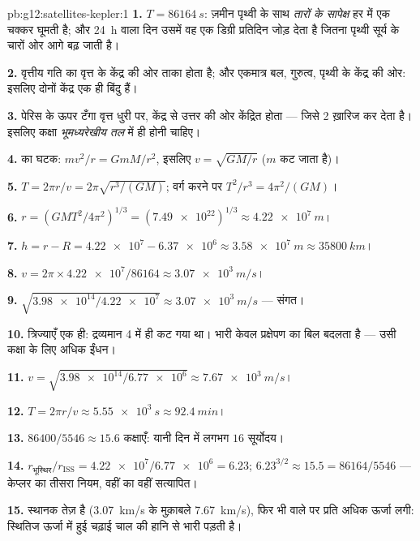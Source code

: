 \begin{solution}{pb:g12:satellites-kepler:1}
\textbf{1.} $T = \qty{86164}{s}$: ज़मीन पृथ्वी के साथ \emph{तारों के सापेक्ष} हर
 में एक चक्कर घूमती है; और \qty{24}{h} वाला दिन उसमें वह एक
डिग्री प्रतिदिन जोड़ देता है जितना पृथ्वी सूर्य के चारों ओर आगे बढ़ जाती है।

\textbf{2.} वृत्तीय गति का  वृत्त के केंद्र की ओर ताका होता
है; और एकमात्र बल, गुरुत्व, पृथ्वी के केंद्र की ओर: इसलिए दोनों केंद्र
एक ही बिंदु हैं।

\textbf{3.} पेरिस के ऊपर टँगा वृत्त धुरी पर, केंद्र से उत्तर की ओर केंद्रित
होता --- जिसे 2 ख़ारिज कर देता है। इसलिए कक्षा \emph{भूमध्यरेखीय तल}
में ही होनी चाहिए।

\textbf{4.}  का  घटक: $m v^2/r = GmM/r^2$, इसलिए $v = \sqrt{GM/r}$
($m$ कट जाता है)।

\textbf{5.} $T = 2\pi r/v = 2\pi\sqrt{r^3/(GM)}$; वर्ग करने पर $T^2/r^3 = 4\pi^2/(GM)$।

\textbf{6.} $r = \left(GMT^2/4\pi^2\right)^{1/3} =
(\num{7.49e22})^{1/3} \approx \qty{4.22e7}{m}$।

\textbf{7.} $h = r - R = \num{4.22e7} - \num{6.37e6} \approx
\qty{3.58e7}{m} \approx \qty{35800}{km}$।

\textbf{8.} $v = 2\pi \times \num{4.22e7}/\num{86164} \approx
\qty{3.07e3}{m/s}$।

\textbf{9.} $\sqrt{\num{3.98e14}/\num{4.22e7}} \approx
\qty{3.07e3}{m/s}$ --- संगत।

\textbf{10.} त्रिज्याएँ एक ही: द्रव्यमान 4 में ही कट गया था। भारी
 केवल प्रक्षेपण का बिल बदलता है --- उसी कक्षा के लिए
अधिक ईंधन।

\textbf{11.} $v = \sqrt{\num{3.98e14}/\num{6.77e6}} \approx
\qty{7.67e3}{m/s}$।

\textbf{12.} $T = 2\pi r/v \approx \qty{5.55e3}{s} \approx
\qty{92.4}{min}$।

\textbf{13.} $\num{86400}/5546 \approx 15.6$ कक्षाएँ: यानी दिन में लगभग $16$ सूर्योदय।

\textbf{14.} $r_{\text{भूस्थिर}}/r_{\text{ISS}} = \num{4.22e7}/\num{6.77e6}
= 6.23$; $6.23^{3/2} \approx 15.5 = \num{86164}/5546$ --- केप्लर का तीसरा नियम, वहीं का वहीं
सत्यापित।

\textbf{15.} स्थानक तेज़ है (\qty{3.07}{km/s} के मुक़ाबले \qty{7.67}{km/s}), फिर भी
 वाले पर प्रति  अधिक ऊर्जा लगी:
स्थितिज ऊर्जा में हुई चढ़ाई चाल की हानि से भारी पड़ती है।


\end{solution}
